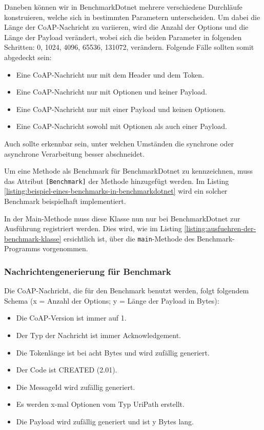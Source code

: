 Daneben können wir in BenchmarkDotnet mehrere verschiedene Durchläufe konstruieren, welche sich in bestimmten Parametern unterscheiden. Um dabei die Länge der CoAP-Nachricht zu variieren, wird die Anzahl der Options und die Länge der Payload verändert, wobei sich die beiden Parameter in folgenden Schritten: 0, 1024, 4096, 65536, 131072, verändern. Folgende Fälle sollten somit abgedeckt sein:
\begin{itemize}
    \item Eine CoAP-Nachricht nur mit dem Header und dem Token.
    \item Eine CoAP-Nachricht nur mit Optionen und keiner Payload.
    \item Eine CoAP-Nachricht nur mit einer Payload und keinen Optionen.
    \item Eine CoAP-Nachricht sowohl mit Optionen als auch einer Payload.
\end{itemize}

Auch sollte erkennbar sein, unter welchen Umständen die synchrone oder asynchrone Verarbeitung besser abschneidet.

Um eine Methode als Benchmark für BenchmarkDotnet zu kennzeichnen, muss das Attribut \texttt{[Benchmark]} der Methode hinzugefügt werden. Im Listing \ref{listing:beispiel-eines-benchmarks-in-benchmarkdotnet} wird ein solcher Benchmark beispielhaft implementiert.

In der Main-Methode muss diese Klasse nun nur bei BenchmarkDotnet zur Ausführung registriert werden. Dies wird, wie im Listing \ref{listing:ausfuehren-der-benchmark-klasse} ersichtlich ist, über die \texttt{main}-Methode des Benchmark-Programms vorgenommen.

\subsubsection{Nachrichtengenerierung für Benchmark}
\label{subsubsec:nachrichtengenerierung-fuer-benchmark}

Die CoAP-Nachricht, die für den Benchmark benutzt werden, folgt folgendem Schema (x = Anzahl der Options; y = Länge der Payload in Bytes):
\begin{itemize}
    \item Die CoAP-Version ist immer auf 1.
    \item Der Typ der Nachricht ist immer Acknowledgement.
    \item Die Tokenlänge ist bei acht Bytes und wird zufällig generiert.
    \item Der Code ist CREATED (2.01).
    \item Die MessageId wird zufällig generiert.
    \item Es werden x-mal Optionen vom Typ UriPath erstellt.
    \item Die Payload wird zufällig generiert und ist y Bytes lang.
\end{itemize}

